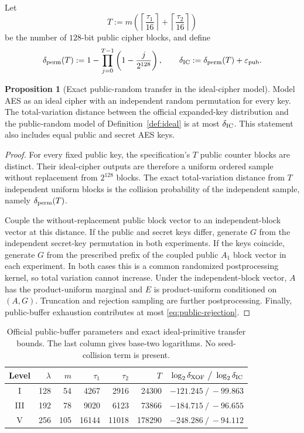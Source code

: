 \documentclass[11pt,a4paper]{article}
\theoremstyle{definition}
\newtheorem{proposition}[theorem]{Proposition}
\theoremstyle{remark}
\begin{document}
Let
\[
T:=m\left(\left\lceil\frac{\tau_1}{16}\right\rceil
          +\left\lceil\frac{\tau_2}{16}\right\rceil\right)
\]
be the number of $128$-bit public cipher blocks, and define
\begin{equation}\label{eq:ideal-cipher-distance}
\delta_{\rm perm}(T)
:=1-\prod_{j=0}^{T-1}\left(1-\frac{j}{2^{128}}\right),
\qquad
\delta_{\rm IC}:=\delta_{\rm perm}(T)+\varepsilon_{\rm pub}.
\end{equation}

\begin{proposition}[Exact public-random transfer in the ideal-cipher model]\label{prop:icm-transfer}
Model AES as an ideal cipher with an independent random permutation for every key.  The total-variation distance between the official expanded-key distribution and the public-random model of Definition~\ref{def:ideal} is at most $\delta_{\rm IC}$.  This statement also includes equal public and secret AES keys.
\end{proposition}

\begin{proof}
For every fixed public key, the specification's $T$ public counter blocks are distinct.  Their ideal-cipher outputs are therefore a uniform ordered sample without replacement from $2^{128}$ blocks.  The exact total-variation distance from $T$ independent uniform blocks is the collision probability of the independent sample, namely $\delta_{\rm perm}(T)$.

Couple the without-replacement public block vector to an independent-block vector at this distance.  If the public and secret keys differ, generate $G$ from the independent secret-key permutation in both experiments.  If the keys coincide, generate $G$ from the prescribed prefix of the coupled public $A_1$ block vector in each experiment.  In both cases this is a common randomized postprocessing kernel, so total variation cannot increase.  Under the independent-block vector, $A$ has the product-uniform marginal and $E$ is product-uniform conditioned on $(A,G)$.  Truncation and rejection sampling are further postprocessing.  Finally, public-buffer exhaustion contributes at most \eqref{eq:public-rejection}.
\end{proof}

\begin{table}[t]
\centering
\small
\setlength{\tabcolsep}{4.3pt}
\caption{Official public-buffer parameters and exact ideal-primitive transfer bounds.  The last column gives base-two logarithms.  No seed-collision term is present.}
\label{tab:seeded-model-bounds}
\begin{tabular}{@{}c r r r r r r@{}}
\toprule
Level & $\lambda$ & $m$ & $\tau_1$ & $\tau_2$ & $T$ & $\log_2\delta_{\rm XOF}\ \big/\ \log_2\delta_{\rm IC}$\\
\midrule
I   &128&54 &4267 &2916 &24300  &$-121.245\ /\ -99.863$\\
III &192&78 &9020 &6123 &73866  &$-184.715\ /\ -96.655$\\
V   &256&105&16144&11018&178290 &$-248.286\ /\ -94.112$\\
\bottomrule
\end{tabular}
\end{table}
\end{document}
